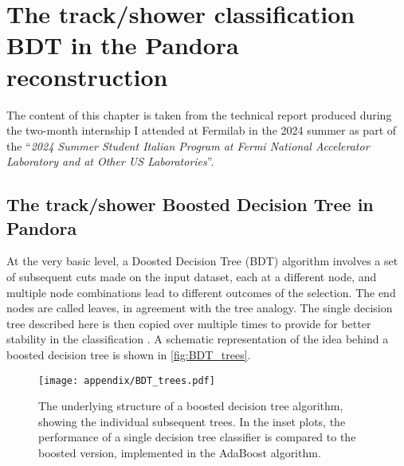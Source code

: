\chapter{The track/shower classification BDT in the Pandora reconstruction}
\label{chap:mva_internship}

The content of this chapter is taken from the technical report produced during the two-month internship I attended at Fermilab in the 2024 summer as part of the ``\emph{2024 Summer Student Italian Program at Fermi National Accelerator Laboratory and at Other US Laboratories}''. 

\section{The track/shower Boosted Decision Tree in Pandora} \label{sec:A_bdt}

At the very basic level, a Doosted Decision Tree (BDT) algorithm involves a set of subsequent cuts made on the input dataset, each at a different node, and multiple node combinations lead to different outcomes of the selection. 
The end nodes are called leaves, in agreement with the tree analogy. 
The single decision tree described here is then copied over multiple times to provide for better stability in the classification \cite{Cornell:2021gut, FREUND1997119}. A schematic representation of the idea behind a boosted decision tree is shown in \autoref{fig:BDT_trees}. 

\begin{figure*}
    \centering
    \texttt{[image: appendix/BDT\_trees.pdf]}
    \caption[Boosted decision tree working principle]{The underlying structure of a boosted decision tree algorithm, showing the individual subsequent trees. In the inset plots, the performance of a single decision tree classifier is compared to the boosted version, implemented in the AdaBoost \cite{FREUND1997119} algorithm.}
    \label{fig:BDT_trees}
\end{figure*}


